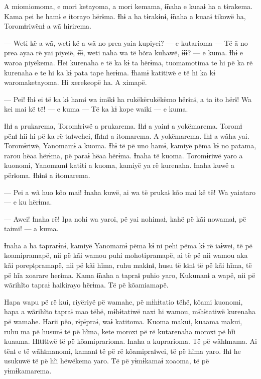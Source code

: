A miomiomoma, e mori ketayoma, a mori kemama, ɨ̃naha e kuaaɨ ha a
tɨrakema. Kama pei he hamɨ e itorayo hërɨma. Ɨhɨ a ha tɨrakɨnɨ, ɨ̃naha a
kuaaɨ tikowë ha, Toromɨriwënɨ a wã hirirema. 

— Weti kë a wã, weti kë a wã no prea yaia kupiyei? --- e kutarioma --- Të
ã no prea ayaa rë yai piyeië, ɨ̃ɨɨ, weti naha wa të hõra kuhawë, ɨ̃ɨɨ? ---
e kuma. Ɨhɨ e waroa piyëkema. Hei kurenaha e të ka kɨ ta hërɨma,
tuomamotima te hi pë ka rë kurenaha e te hi ka kɨ pata tape herɨma.
Ɨhamɨ katitiwë e të hi ka kɨ waromaketayoma. Hi xerekeopë ha. A ximapë. 

— Pei! Ɨhɨ ei të ka kɨ hamɨ wa imɨkɨ ha rukëkërukëkëmo hërɨnɨ, a ta ito
hërɨ! Wa kei mai kë të! --- e kuma --- Të ka kɨ kope waiki --- e kuma. 

Ɨhɨ a prukarema, Toromɨriwë a prukarema. Ɨhɨ a yainɨ a yokëmarema.
Toromɨ pënɨ hii hi pë ka rë taɨwehei, ɨ̃hɨnɨ a itomarema. A yokëmarema.
Ɨhɨ a wãha yai. Toromɨriwë, Yanomamɨ a kuoma. Ɨhɨ të pë uno hamɨ, kamiyë
pëma kɨ no patama, rarou hëaa hërɨma, pë paraɨ hëaa hërɨma. Ɨnaha të
kuoma. Toromɨriwë yaro a kuonomi, Yanomamɨ katiti a kuoma, kamiyë ya rë
kurenaha. Ɨnaha kuwë a përɨoma. Ɨhɨnɨ a itomarema.

 

 

— Pei a wã huo kõo mai! Ɨnaha kuwë, ai wa të prukaɨ kõo mai kë të! Wa
yaiataro --- e ku hërɨma. 

--- Awei! Ɨnaha rë! Ipa nohi wa yaroi, pë yai nohimaɨ, kahë pë kãi
nowamaɨ, pë taimi! --- a kuma. 

Ɨnaha a ha taprarɨnɨ, kamiyë Yanomamɨ pëma kɨ ni pehi pëma kɨ rë iaɨwei,
të pë koamipramapë, nii pë kãi wamou puhi mohotipramapë, ai të pë nii
wamou aka kãi porepɨpramapë, nii pë kãi hĩma, ruhu makɨnɨ, husu të kɨnɨ
të pë kãi hĩma, të pë hĩa xoarare herɨma. Kama ɨ̃naha a tapraɨ puhio
yaro, Kukunanɨ a wapë, nii pë wãrihĩto tapraɨ haikirayo hërɨma. Të pë
kõamiamapë. 

Hapa wapu pë rë kui, riyëriyë pë wamahe, pë mɨhɨtatio tëhë, kõami
kuonomi, hapa a wãrihĩto tapraɨ mao tëhë, mɨhɨtatiwë naxi hi wamou,
mɨhɨtatiwë kurenaha pë wamahe. Harii pëo, rɨpɨpraɨ, waɨ katitoma. Kuoma
makui, kuaama makui, ruhu ma pë husunɨ të pë hĩma, kete moroxi pë rë
kutarenaha moroxi pë hĩi kuaama. Hɨtɨtɨwë të pë kõamiprarioma. Ɨnaha a
kuprarioma. Të pë wãhɨmama. Ai tënɨ e të wãhɨmanomi, kamanɨ të pë rë
kõamipraɨwei, të pë hĩma yaro. Ɨhɨ he usukuwë të pë hĩi hëwëkema yaro.
Të pë yɨmɨkamaɨ xoaoma, të pë yɨmɨkamarema. 

 

